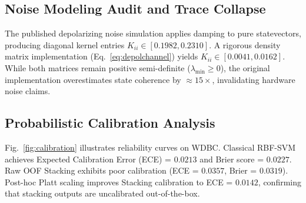 \documentclass[journal,twocolumn]{IEEEtran}
\begin{document}
\subsection{Noise Modeling Audit and Trace Collapse}
\label{sec:noise}

The published depolarizing noise simulation applies damping to pure statevectors, producing diagonal kernel entries $K_{ii} \in [0.1982, 0.2310]$. A rigorous density matrix implementation (Eq.~\ref{eq:depolchannel}) yields $K_{ii} \in [0.0041, 0.0162]$. While both matrices remain positive semi-definite ($\lambda_{\min} \ge 0$), the original implementation overestimates state coherence by $\approx 15\times$, invalidating hardware noise claims.

\subsection{Probabilistic Calibration Analysis}
\label{sec:calibration}

Fig.~\ref{fig:calibration} illustrates reliability curves on WDBC. Classical RBF-SVM achieves Expected Calibration Error (ECE) = $0.0213$ and Brier score = $0.0227$. Raw OOF Stacking exhibits poor calibration (ECE = $0.0357$, Brier = $0.0319$). Post-hoc Platt scaling improves Stacking calibration to ECE = $0.0142$, confirming that stacking outputs are uncalibrated out-of-the-box.
\end{document}
